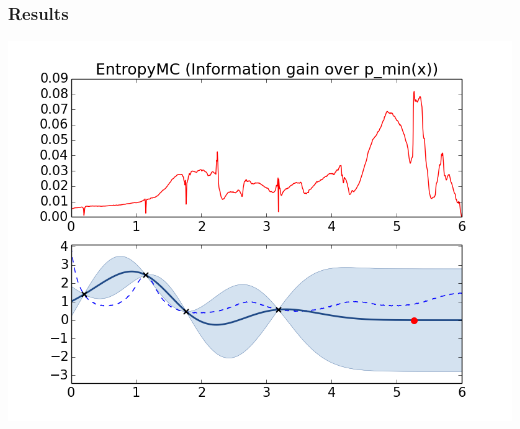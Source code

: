 \documentclass[10pt,handout]{beamer}
\begin{document}
\begin{frame}
\frametitle{Results}
\includegraphics[width=\textwidth]{EntropyMC.png}
\end{frame}
\end{document}
